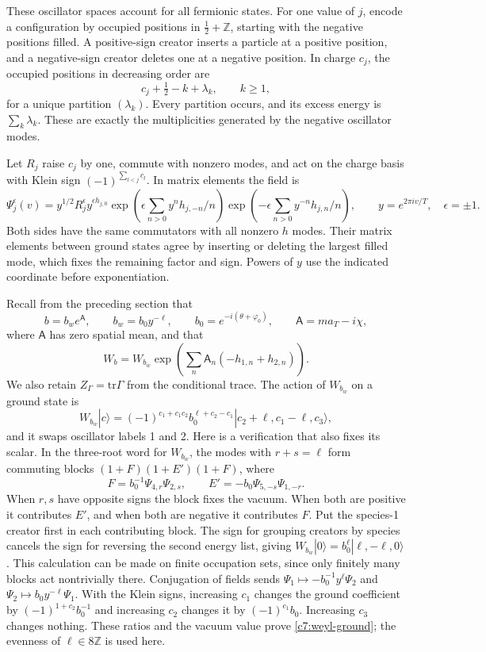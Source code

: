 These oscillator spaces account for all fermionic states.  For one value of
$j$, encode a configuration by occupied positions in $\tfrac12+\mathbb Z$,
starting with the negative positions filled.  A positive-sign creator inserts
a particle at a positive position, and a negative-sign creator deletes one at
a negative position.  In charge $c_j$, the occupied positions in decreasing
order are
\[
c_j+\tfrac12-k+\lambda_k,\qquad k\ge1,
\]
for a unique partition $(\lambda_k)$.  Every partition occurs, and its
excess energy is $\sum_k\lambda_k$.  These are exactly the multiplicities
generated by the negative oscillator modes.

Let $R_j$ raise $c_j$ by one, commute with nonzero modes, and act on the
charge basis with Klein sign $(-1)^{\sum_{l<j}c_l}$.  In matrix elements the
field is
\begin{equation}\label{c7:vertex-field}
\Psi_j^\epsilon(v)=y^{1/2}R_j^\epsilon y^{\epsilon h_{j,0}}
 \exp\!\left(\epsilon\sum_{n>0}y^n h_{j,-n}/n\right)
 \exp\!\left(-\epsilon\sum_{n>0}y^{-n}h_{j,n}/n\right),
\qquad y=e^{2\pi i v/T},\quad \epsilon=\pm1.
\end{equation}
Both sides have the same commutators with all nonzero $h$ modes.  Their
matrix elements between ground states agree by inserting or deleting the
largest filled mode, which fixes the remaining factor and sign.  Powers of
$y$ use the indicated coordinate before exponentiation.

Recall from the preceding section that
\[
b=b_w e^{\mathsf A},\qquad b_w=b_0y^{-\ell},\qquad
b_0=e^{-i(\theta+\varphi_0)},\qquad
\mathsf A=m a_T-i\chi,
\]
where $\mathsf A$ has zero spatial mean, and that
\[
W_b=W_{b_w}\exp\!\left(\sum_n\mathsf A_n(-h_{1,n}+h_{2,n})\right).
\]
We also retain $Z_\Gamma=\mathrm{tr}\Gamma$ from the conditional trace.
The action of $W_{b_w}$ on a ground state is
\begin{equation}\label{c7:weyl-ground}
W_{b_w}|c\rangle
=(-1)^{c_1+c_1c_2}b_0^{\ell+c_2-c_1}
  |c_2+\ell,c_1-\ell,c_3\rangle,
\end{equation}
and it swaps oscillator labels 1 and 2.  Here is a verification that also
fixes its scalar.  In the three-root word for $W_{b_w}$, the modes with
$r+s=\ell$ form commuting blocks $(1+F)(1+E')(1+F)$, where
\[
F=b_0^{-1}\Psi_{4,r}\Psi_{2,s},\qquad
E'=-b_0\Psi_{5,-s}\Psi_{1,-r}.
\]
When $r,s$ have opposite signs the block fixes the vacuum.  When both are
positive it contributes $E'$, and when both are negative it contributes
$F$.  Put the species-1 creator first in each contributing block.  The sign
for grouping creators by species cancels the sign for reversing the second
energy list, giving
$W_{b_w}|0\rangle=b_0^\ell|\ell,-\ell,0\rangle$.
This calculation can be made on finite occupation sets, since only finitely
many blocks act nontrivially there.  Conjugation of fields sends
$\Psi_1\mapsto-b_0^{-1}y^\ell\Psi_2$ and
$\Psi_2\mapsto b_0y^{-\ell}\Psi_1$.  With the Klein signs, increasing
$c_1$ changes the ground coefficient by $(-1)^{1+c_2}b_0^{-1}$ and
increasing $c_2$ changes it by $(-1)^{c_1}b_0$.  Increasing $c_3$ changes
nothing.  These ratios and the vacuum value prove
\eqref{c7:weyl-ground}; the evenness of $\ell\in8\mathbb Z$ is used here.

